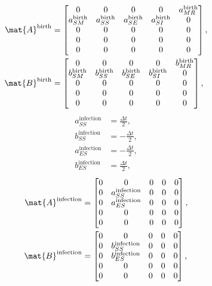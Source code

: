 \documentclass{jpmarticle}
\begin{document}
\begin{equation}
  \begin{split}
    \mat{A}^{\text{birth}} &=
    \begin{bmatrix}
      0 & 0 & 0 & 0 & a_{MR}^{\text{birth}}
      \\
      a_{SM}^{\text{birth}} & a_{SS}^{\text{birth}} &
      a_{SE}^{\text{birth}} &
      a_{SI}^{\text{birth}} & 0
      \\
      0 & 0 & 0 & 0 & 0
      \\
      0 & 0 & 0 & 0 & 0
      \\
      0 & 0 & 0 & 0 & 0
    \end{bmatrix},
    \\
    \mat{B}^{\text{birth}} &=
    \begin{bmatrix}
      0 & 0 & 0 & 0 & b_{MR}^{\text{birth}}
      \\
      b_{SM}^{\text{birth}} & b_{SS}^{\text{birth}} &
      b_{SE}^{\text{birth}} & b_{SI}^{\text{birth}} & 0
      \\
      0 & 0 & 0 & 0 & 0
      \\
      0 & 0 & 0 & 0 & 0
      \\
      0 & 0 & 0 & 0 & 0
    \end{bmatrix},
  \end{split}
\end{equation}
\begin{equation}
  \begin{split}
    a_{SS}^{\text{infection}} &=
    \frac{\Delta t}{2},
    \\
    b_{SS}^{\text{infection}} &=
    - \frac{\Delta t}{2},
    \\
    a_{ES}^{\text{infection}} &=
    - \frac{\Delta t}{2},
    \\
    b_{ES}^{\text{infection}} &=
    \frac{\Delta t}{2},
  \end{split}
\end{equation}
\begin{equation}
  \begin{split}
    \mat{A}^{\text{infection}} &=
    \begin{bmatrix}
      0 & 0 & 0 & 0 & 0
      \\
      0 & a_{SS}^{\text{infection}} & 0 & 0 & 0
      \\
      0 & a_{ES}^{\text{infection}} & 0 & 0 & 0
      \\
      0 & 0 & 0 & 0 & 0
      \\
      0 & 0 & 0 & 0 & 0
    \end{bmatrix},
    \\
    \mat{B}^{\text{infection}} &=
    \begin{bmatrix}
      0 & 0 & 0 & 0 & 0
      \\
      0 & b_{SS}^{\text{infection}} & 0 & 0 & 0
      \\
      0 & b_{ES}^{\text{infection}} & 0 & 0 & 0
      \\
      0 & 0 & 0 & 0 & 0
      \\
      0 & 0 & 0 & 0 & 0
    \end{bmatrix},
  \end{split}
\end{equation}
\end{document}
